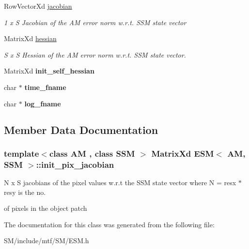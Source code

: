 \begin{DoxyCompactItemize}
\item 
\hypertarget{classESM_a54c786ab12bd20583b776fef3e52db51}{Row\-Vector\-Xd \hyperlink{classESM_a54c786ab12bd20583b776fef3e52db51}{jacobian}}\label{classESM_a54c786ab12bd20583b776fef3e52db51}

\begin{DoxyCompactList}\small\item\em 1 x S Jacobian of the A\-M error norm w.\-r.\-t. S\-S\-M state vector \end{DoxyCompactList}\item 
\hypertarget{classESM_a69a09c6bb6acfb2a5755222fcad2cdc6}{Matrix\-Xd \hyperlink{classESM_a69a09c6bb6acfb2a5755222fcad2cdc6}{hessian}}\label{classESM_a69a09c6bb6acfb2a5755222fcad2cdc6}

\begin{DoxyCompactList}\small\item\em S x S Hessian of the A\-M error norm w.\-r.\-t. S\-S\-M state vector. \end{DoxyCompactList}\item 
\hypertarget{classESM_a05c432d395f668e3c48631f775000dbd}{Matrix\-Xd {\bfseries init\-\_\-self\-\_\-hessian}}\label{classESM_a05c432d395f668e3c48631f775000dbd}

\item 
\hypertarget{classESM_ac22d50d7b2c34fc854a4e604018c9a0a}{char $\ast$ {\bfseries time\-\_\-fname}}\label{classESM_ac22d50d7b2c34fc854a4e604018c9a0a}

\item 
\hypertarget{classESM_ae47e8c53aa0e9e60f426b1291570168d}{char $\ast$ {\bfseries log\-\_\-fname}}\label{classESM_ae47e8c53aa0e9e60f426b1291570168d}

\end{DoxyCompactItemize}


\subsection{Member Data Documentation}
\hypertarget{classESM_a94ba04c1951052b8d82377aff8aab97c}{
\subsubsection[{init\-\_\-pix\-\_\-jacobian}]{\setlength{\rightskip}{0pt plus 5cm}template$<$class A\-M , class S\-S\-M $>$ Matrix\-Xd {\bf E\-S\-M}$<$ A\-M, S\-S\-M $>$\-::init\-\_\-pix\-\_\-jacobian\hspace{0.3cm}{\ttfamily [protected]}}}\label{classESM_a94ba04c1951052b8d82377aff8aab97c}


N x S jacobians of the pixel values w.\-r.\-t the S\-S\-M state vector where N = resx $\ast$ resy is the no. 

of pixels in the object patch 

The documentation for this class was generated from the following file\-:\begin{DoxyCompactItemize}
\item 
S\-M/include/mtf/\-S\-M/E\-S\-M.\-h\end{DoxyCompactItemize}

